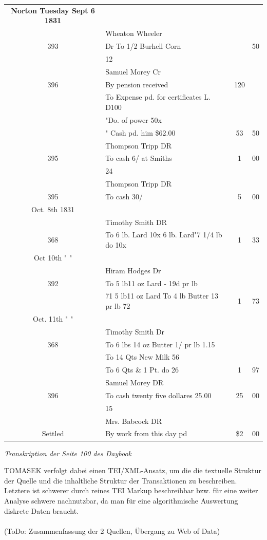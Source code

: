 \documentclass[12pt,a4paper]{article}
\begin{document}
\begin{tabular}{clcc}
 \textbf{Norton Tuesday Sept 6 1831}\\
    & Wheaton Wheeler & &\\
393 & Dr To 1/2 Burhell Corn & & 50 \\
    & 12 & &\\
    & Samuel Morey  Cr  & &\\
396 & By pension received & 120 & \\
    & To Expense pd. for certificates L. D100 & &\\
    & "Do. of power 50x & &\\
    & " Cash pd. him \$62.00 & 53 & 50\\
    & Thompson Tripp  DR  & &\\
395 & To cash 6/ at Smiths & 1 & 00\\	
    & 24 & &\\
    & Thompson Tripp  DR & &\\	
395 & To cash 30/ & 5  & 00\\		
Oct. 8th 1831\\
    & Timothy Smith DR & &\\
368 & To 6 lb. Lard 10x 6 lb. Lard"7 1/4 lb do 10x & 1 & 33 \\
Oct 10th " "\\
    & Hiram Hodges Dr & &\\
392 & To 5 lb11 oz Lard - 19d pr lb\\
    & 71 5 lb11 oz Lard To 4 lb Butter 13 pr lb 72 & 1 & 73\\
Oct. 11th " "\\
    & Timothy Smith  Dr& &\\
368 & To 6 lbs 14 oz Butter 1/ pr lb 1.15 & & \\ & To 14 Qts New Milk 56 & &\\
& To 6 Qts \& 1 Pt. do 26 & 1 & 97 	\\	
    & Samuel Morey DR & &\\
396 & To cash twenty five dollares 25.00 & 25 & 00\\
    & 15 & & \\	
    & Mrs. Babcock DR  & & \\		
Settled & By work from this day pd & \$2 & 00
\end{tabular}
\medskip
\begin{center}
\textit{Transkription der Seite 100 des \textit{Daybook}}
\end{center}
TOMASEK verfolgt dabei einen TEI/XML-Ansatz, um die die textuelle Struktur der Quelle und die inhaltliche Struktur der Transaktionen zu beschreiben. Letztere ist schwerer durch reines TEI Markup beschreibbar bzw. für eine weiter Analyse schwere nachnutzbar, da man für eine algorithmische Auswertung diskrete Daten braucht.
\\
\\
(ToDo: Zusammenfassung der 2 Quellen, Übergang zu Web of Data)
\end{document}
